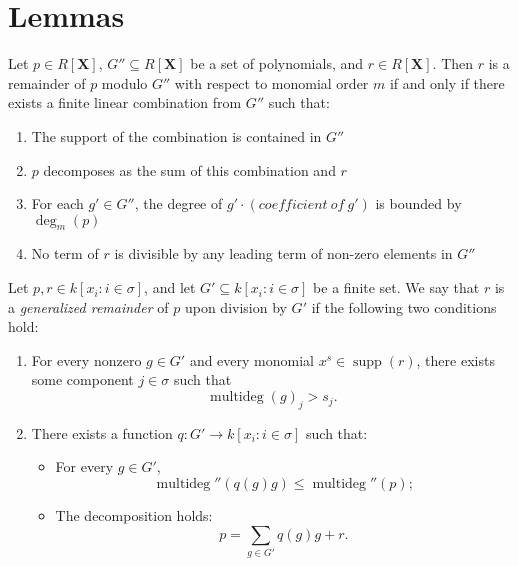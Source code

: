 \chapter{Lemmas}

\begin{lemma}\label{zero_le}

  \leanok

\end{lemma}

\begin{lemma}\label{IsRemainder_def'}
  \leanok
  Let $p \in R[\mathbf{X}]$, $G'' \subseteq R[\mathbf{X}]$ be a set of polynomials,
and $r \in R[\mathbf{X}]$. Then $r$ is a remainder of $p$ modulo $G''$ with respect to
monomial order $m$ if and only if there exists a finite linear combination from $G''$
such that:
\begin{enumerate}
\item The support of the combination is contained in $G''$
\item $p$ decomposes as the sum of this combination and $r$
\item For each $g' \in G''$, the degree of $g' \cdot (coefficient\ of\ g')$
  is bounded by $\deg_m(p)$
\item No term of $r$ is divisible by any leading term of non-zero elements in $G''$
\end{enumerate}
\end{lemma}

\begin{lemma}\label{IsRemainder_def''}
  \leanok
  Let \( p, r \in k[x_i : i \in \sigma] \), and let \( G' \subseteq k[x_i : i \in \sigma] \) be a finite set.
We say that \( r \) is a \emph{generalized remainder} of \( p \) upon division by \( G' \) if the following two conditions hold:

\begin{enumerate}
\item For every nonzero \( g \in G' \) and every monomial \( x^s \in \operatorname{supp}(r) \),
there exists some component \( j \in \sigma \) such that
\[
\operatorname{multideg}(g)_j > s_j.
\]
\item There exists a function \( q : G' \to k[x_i : i \in \sigma] \) such that:
\begin{itemize}
\item For every \( g \in G' \),
  \[
  \operatorname{multideg}''(q(g)g) \leq \operatorname{multideg}''(p);
  \]
\item The decomposition holds:
  \[
  p = \sum_{g \in G'} q(g)g + r.
  \]
\end{itemize}
\end{enumerate}

\end{lemma}

